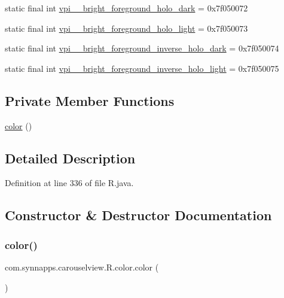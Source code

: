 \begin{DoxyCompactItemize}
static final int \mbox{\hyperlink{classcom_1_1synnapps_1_1carouselview_1_1_r_1_1color_ab6fd36d21efca6853834fb2846f7f304}{vpi\+\_\+\+\_\+bright\+\_\+foreground\+\_\+holo\+\_\+dark}} = 0x7f050072
\item 
static final int \mbox{\hyperlink{classcom_1_1synnapps_1_1carouselview_1_1_r_1_1color_a39381570986410e4fea55442f0333f2f}{vpi\+\_\+\+\_\+bright\+\_\+foreground\+\_\+holo\+\_\+light}} = 0x7f050073
\item 
static final int \mbox{\hyperlink{classcom_1_1synnapps_1_1carouselview_1_1_r_1_1color_a33f7824b56171cc13e63accbb28cb992}{vpi\+\_\+\+\_\+bright\+\_\+foreground\+\_\+inverse\+\_\+holo\+\_\+dark}} = 0x7f050074
\item 
static final int \mbox{\hyperlink{classcom_1_1synnapps_1_1carouselview_1_1_r_1_1color_a94c978e237a3b2d2d1fe8c6a5e1b865d}{vpi\+\_\+\+\_\+bright\+\_\+foreground\+\_\+inverse\+\_\+holo\+\_\+light}} = 0x7f050075
\end{DoxyCompactItemize}
\subsection*{Private Member Functions}
\begin{DoxyCompactItemize}
\item 
\mbox{\hyperlink{classcom_1_1synnapps_1_1carouselview_1_1_r_1_1color_a7c79c817678f2f1fbe12b2470f536cf3}{color}} ()
\end{DoxyCompactItemize}


\subsection{Detailed Description}


Definition at line 336 of file R.\+java.



\subsection{Constructor \& Destructor Documentation}
\mbox{\label{classcom_1_1synnapps_1_1carouselview_1_1_r_1_1color_a7c79c817678f2f1fbe12b2470f536cf3}} 
\subsubsection{\texorpdfstring{color()}{color()}}
{\footnotesize\ttfamily com.\+synnapps.\+carouselview.\+R.\+color.\+color (\begin{DoxyParamCaption}{ }\end{DoxyParamCaption})\hspace{0.3cm}{\ttfamily [private]}}



